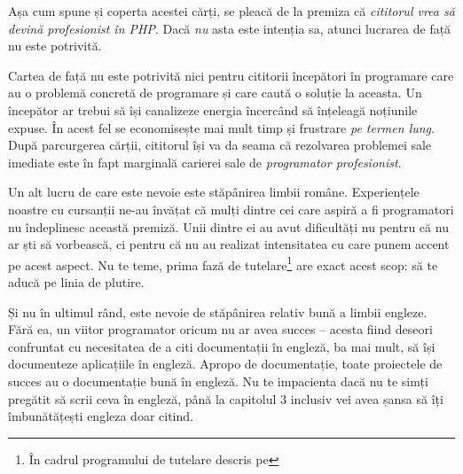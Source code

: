 
Așa cum spune și coperta acestei cărți, se pleacă de la premiza că
\textit{cititorul vrea să devină profesionist în PHP}. Dacă \textit{nu} asta
este intenția sa, atunci lucrarea de față nu este potrivită.

Cartea de față nu este potrivită nici pentru cititorii începători în programare
care au o problemă concretă de programare și care caută o soluție la aceasta.
Un începător ar trebui să își canalizeze energia încercând să înțeleagă
noțiunile expuse.  În acest fel se economisește mai mult timp și frustrare
\textit{pe termen lung}. După parcurgerea cărții, cititorul își va da seama că
rezolvarea problemei sale imediate este în fapt marginală carierei sale de
\textit{programator profesionist}.


Un alt lucru de care este nevoie este stăpânirea limbii române. Experiențele
noastre cu cursanții ne-au învățat că mulți dintre cei care aspiră a fi
programatori nu îndeplinesc această premiză. Unii dintre ei au avut dificultăți
nu pentru că nu ar ști să vorbească, ci pentru că nu au realizat intensitatea
cu care punem accent pe acest aspect. Nu te teme, prima fază de
tutelare\footnote{În cadrul programului de tutelare descris pe \phpro} are
exact acest scop: să te aducă pe linia de plutire.

Și nu în ultimul rând, este nevoie de stăpânirea relativ bună a limbii engleze.
Fără ea, un viitor programator oricum nu ar avea succes -- acesta fiind deseori
confruntat cu necesitatea de a citi documentații în engleză, ba mai mult, să își documenteze
aplicațiile în engleză. Apropo de documentație, toate proiectele de succes au
o documentație bună în engleză. Nu te impacienta dacă nu te simți pregătit să
scrii ceva în engleză, până la capitolul 3 inclusiv vei avea șansa să îți
îmbunătățești engleza doar citind.

